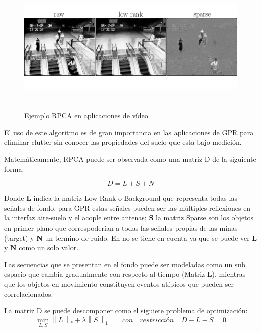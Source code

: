 \begin{figure}[H]
\centering
\includegraphics[height=6.5cm,keepaspectratio]{chapter2/images/example_RPCA.png}

\caption{Ejemplo RPCA en aplicaciones de vídeo }
\label{fig:example_rpca}
\end{figure}

El uso de este algoritmo es de gran importancia en las aplicaciones de GPR para eliminar clutter sin conocer las propiedades del suelo que esta bajo medición.

Matemáticamente, RPCA puede ser observada como una matriz D de la siguiente forma:

\begin{equation}
    D=L+S+N
    \label{eq:rpca_general}
\end{equation}

Donde \textbf{L} indica la matriz Low-Rank o Background que representa todas las señales de fondo, para GPR estas señales pueden ser las múltiples reflexiones en la interfaz aire-suelo y el acople entre antenas; \textbf{S} la matriz Sparse son los objetos en primer plano  que correspoderían a todas las señales propias de las minas (target)   y \textbf{N} un termino de ruido. En \cite{rpca_review}  no se tiene en cuenta ya que se puede ver \textbf{L} y \textbf{N} como un solo valor.

Las secuencias que se presentan en el fondo puede ser modeladas como un sub espacio que cambia gradualmente con respecto al tiempo (Matriz \textbf{L}), mientras que los objetos en movimiento constituyen eventos atípicos que pueden ser correlacionados.


La matriz D se puede descomponer como el siguiete problema de optimización:
\begin{equation}
\min _{ L,S }{ { \left\| L \right\|  }_{ * } } +\lambda {\left\| S \right\| }_{1}\quad \quad  con \quad   restricción\quad  D-L-S=0
\label{eq:minimizar}
\end{equation}


